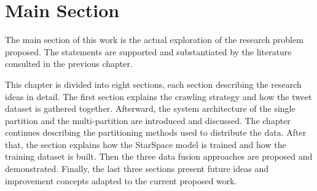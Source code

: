 \chapter{Main Section}

The main section of this work is the actual exploration of the research problem proposed. The statements are supported and substantiated by the literature consulted in the previous chapter.

This chapter is divided into eight sections, each section describing the research ideas in detail. The first section explains the crawling strategy and how the tweet dataset is gathered together. Afterward, the system architecture of the single partition and the multi-partition are introduced and discussed. The chapter continues describing the partitioning methods used to distribute the data. After that, the section explains how the StarSpace model is trained and how the training dataset is built. Then the three data fusion approaches are proposed and demonstrated. Finally, the last three sections present future ideas and improvement concepts adapted to the current proposed work.
